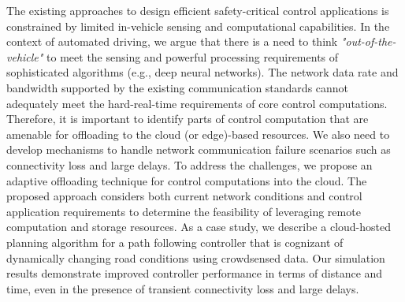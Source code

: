 {
\rm
The existing approaches to design efficient safety-critical control applications is constrained by limited in-vehicle sensing and computational capabilities. In the context of automated driving, we argue that there is a need to think {\em "out-of-the-vehicle"} to meet the sensing and powerful processing requirements of sophisticated algorithms (e.g., deep neural networks). The network data rate and bandwidth supported by the existing communication standards cannot adequately meet the hard-real-time requirements of core control computations. Therefore, it is important to identify parts of control computation that are amenable for offloading to the cloud (or edge)-based resources. We also need to develop mechanisms to handle network communication failure scenarios such as connectivity loss and large delays. To address the challenges, we propose an adaptive offloading technique for control computations into the cloud. The proposed approach considers both current network conditions and control application requirements to determine the feasibility of leveraging remote computation and storage resources. As a case study, we describe a cloud-hosted planning algorithm for a path following controller that is cognizant of dynamically changing road conditions using crowdsensed data. Our simulation results demonstrate improved controller performance in terms of distance and time, even in the presence of transient connectivity loss and large delays.	
}